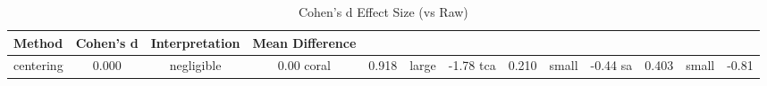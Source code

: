 \begin{table}[htbp]
\centering
\caption{Cohen's d Effect Size (vs Raw)}
\label{tab:cohend}
\begin{tabular}{lccc}
\toprule
Method & Cohen's d & Interpretation & Mean Difference \\
\midrule
centering & 0.000 & negligible & 0.00%
coral & 0.918 & large & -1.78%
tca & 0.210 & small & -0.44%
sa & 0.403 & small & -0.81%
\bottomrule
\end{tabular}
\end{table}